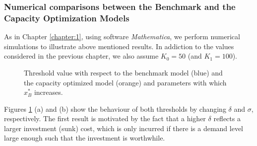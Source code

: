 \subsubsection{Numerical comparisons between the Benchmark and the Capacity Optimization Models}

As in Chapter \ref{chapter:1}, using software \textit{Mathematica}, we perform numerical simulations to illustrate above mentioned results. 
In addiction to the values considered in the previous chapter, we also assume $K_0=50$ (and $K_1=100$).



\begin{figure}[!htb]
	\begin{subfigmatrix}{2}
	\end{subfigmatrix}
	\caption{Threshold value with respect to the benchmark model (blue) and the capacity optimized model (orange) and parameters with which $x^*_B$ increases.}
	\label{fig:2_x2}
\end{figure}


Figures \ref{fig:2_x2} (a) and (b) show the behaviour of both thresholds by changing $\delta$ and $\sigma$, respectively. 
The first result is motivated by the fact that a higher $\delta$ reflects a larger investment (sunk) cost, which is only incurred if there is a demand level large enough such that the investment is worthwhile.

